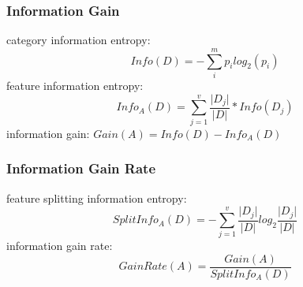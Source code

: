 \documentclass{beamer}
\begin{document}
\begin{frame}
\frametitle{Information Gain}
 category information entropy: 
\begin{equation*}
Info(D)=-\sum_{i}^{m} p_i log_2(p_i)
\end{equation*}
feature information entropy:
\begin{equation*}
Info_{A}(D)=\sum_{j=1}^{v}\frac{\vert D_j \vert}{\vert D\vert}*Info(D_j)
\end{equation*}
information gain: $Gain(A)=Info(D)-Info_{A}(D)$
\end{frame}


\begin{frame}
\frametitle{Information Gain Rate}
 feature splitting information entropy: 
\begin{equation*}
SplitInfo_{A}(D)=-\sum_{j=1}^{v}\frac{\vert D_j \vert}{\vert D\vert} log_{2}\frac{\vert D_j \vert}{\vert D\vert}
\end{equation*}
information gain rate:
\begin{equation*}
GainRate(A)=\frac{Gain(A)}{SplitInfo_{A}(D)}
\end{equation*}
\end{frame}
\end{document}

